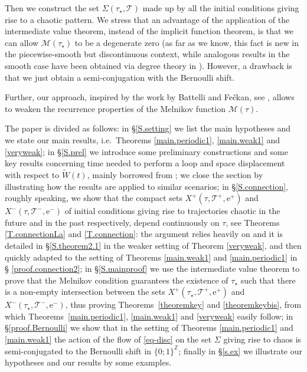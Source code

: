 \documentclass[10pt]{article}
\numberwithin{equation}{section}
\def\Z{{\mathbb Z}}
\def\ee{{\mathrm e}}
\def\MM{{\mathcal M}}
\def\TT{{\mathcal T}}
\theoremstyle{definition}
\theoremstyle{remark}
\begin{document}
Then we construct
the set $\Sigma(\tau_{\star}, \TT)$ made up by all the initial conditions giving rise to a chaotic pattern.
 We stress that an advantage of the application of the intermediate value theorem,  instead of the implicit function theorem, is that we
can allow $\MM(\tau_{\star})$ to be a degenerate zero
(as far as we know, this fact is new in the piecewise-smooth but discontinuous context,
while  analogous results in the smooth case have been obtained  via degree theory
in \cite{BF02C, BF02M}). However, a drawback  is that we just obtain a semi-conjugation with the Bernoulli shift.

Further, our approach, inspired by the work by Battelli and Fe\v ckan, see \cite{BF08, BF10, BF11, BF12}, allows  to weaken the recurrence properties of the Melnikov
function $\MM(\tau)$.

The paper is divided as follows: in \S \ref{S.setting} we list the main hypotheses and we state our main results, i.e.\ Theorems \ref{main.periodic1}, \ref{main.weak1}
and \ref{veryweak}; in \S  \ref{S.prel} we introduce some preliminary constructions and some key results concerning time needed to perform a loop and space displacement with respect to $\tilde{W}(t)$, mainly borrowed from \cite{CFPRimut}; we close the section by illustrating how the results are applied to similar scenarios;
in \S \ref{S.connection}, roughly speaking, we show  that the compact sets $X^+(\tau, \TT^+, \ee^+)$ and $X^-(\tau, \TT^-, \ee^-)$ of initial
conditions giving rise to trajectories chaotic in the future and in the past respectively, depend continuously on $\tau$, see Theorems
\ref{T.connectionLa} and \ref{T.connection}:
the argument relies heavily on \cite{CFPrestate} and it is detailed in \S \ref{S.theorem2.1} in the weaker setting of Theorem
\ref{veryweak}, and then quickly adapted to the setting of Theorems \ref{main.weak1} and \ref{main.periodic1} in  \S
\ref{proof.connection2};
in \S \ref{S.mainproof} we use the intermediate value theorem   to prove
that the Melnikov condition guarantees the existence of $\tau_{\star}$ such that there is a non-empty intersection between the sets $X^+(\tau_{\star}, \TT^+, \ee^+)$
and $X^-(\tau_{\star}, \TT^-, \ee^-)$, thus proving Theorems~\ref{theoremkey} and \ref{theoremkeybis}, from which
Theorems~\ref{main.periodic1}, \ref{main.weak1}
and \ref{veryweak} easily follow;  in \S \ref{proof.Bernoulli} we show that in the setting of Theorems
\ref{main.periodic1} and \ref{main.weak1} the action of the flow of \eqref{eq-disc} on the set $\Sigma$ giving rise to chaos
is semi-conjugated to the Bernoulli shift in $\{0 ; 1 \}^{\Z}$;  finally in \S \ref{s.ex} we illustrate our hypotheses and our results by some examples.
\end{document}
